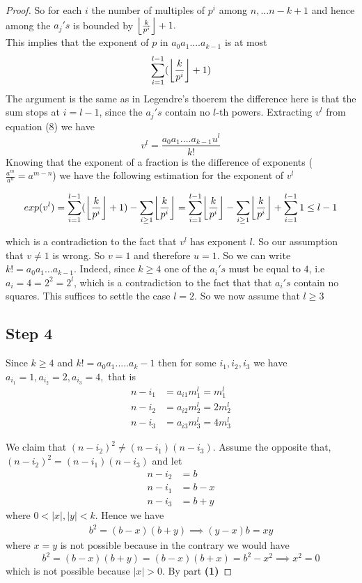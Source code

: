 \documentclass[a4paper]{article}
\DeclarePairedDelimiter\floor{\lfloor}{\rfloor}
\begin{document}
\begin{proof}
So for each $i$ the number of multiples of $p^i$ among $n,...n-k+1$ and hence among the $a_j's$ is bounded by $ \floor*{\frac{k}{p^i}} + 1.$ \\

This implies that the exponent of $p$ in $a_0 a_1....a_{k-1}$ is at most
\begin{equation}
\sum_{i=1}^{l-1} (\floor*{\frac{k}{p^i}} + 1)
\end{equation}
The argument is the same as in Legendre's thoerem the difference here is that the sum stops at $i=l-1$, since the $a_j's$ contain no $l$-th powers. Extracting $v^l$ from equation (8) we have
$$v^l = \frac{a_0 a_1....a_{k-1} u^l}{k!}$$
Knowing that the exponent of a fraction is the difference of exponents ($\frac{a^m}{a^n}=a^{m-n}$) we have the following estimation for the exponent of $v^l$ 

\begin{align}
 exp(v^l)=\sum_{i=1}^{l-1} (\floor*{\frac{k}{p^i}} + 1) - \sum_{i\geq1} \floor*{\frac{k}{p^i}}= \sum_{i=1}^{l-1} \floor*{\frac{k}{p^i}} - \sum_{i\geq1} \floor*{\frac{k}{p^i}} + \sum_{i=1}^{l-1} 1 \leq l-1
\end{align}

which is a contradiction to the fact that $v^l$ has exponent $l$. So our assumption that $v \neq 1$ is wrong. So $v=1$ and therefore $u=1$. So we can write $k!= a_{0}a_{1}\dots a_{k-1}$. Indeed, since $k \geq 4$ one of the $a_i's$ must be equal to $4$, i.e $a_i = 4 = 2^2 =2^l$, which is a contradiction to the fact that that $a_i's$  contain no squares.
This suffices to settle the case $l=2$. So we now assume that $l \geq 3$

\subsection{Step 4}

Since $k \geq 4$ and $k! = a_0 a_1.....a_k-1$ then  for some $i_1, i_2, i_3$ we have $a_{i_1}=1, a_{i_2}=2, a_{i_3}=4,$ that is
\begin{align*}
n-i_1 & = a_{i1} m_1^{l} = m_1^{l}  \\
n-i_2 &= a_{i2} m_2^{l} = 2m_2^{l}\\
n-i_3 &= a_{i3} m_3^{l} = 4m_3^l
\end{align*}

We claim that $(n-i_2)^2 \neq (n-i_1)(n-i_3)$. Assume the opposite that,
$(n-i_2)^2 = (n-i_1)(n-i_3)$ and let 
\begin{align*}
n-i_2&=b \\
n-i_1 &= b-x \\
n-i_3 &= b+y
\end{align*}
where $0 <|x|,|y|<k $. Hence we have
\begin{align*}
b^2 = (b-x)(b+y)  \implies  (y-x)b = xy
\end{align*}
where $x=y$ is not possible because in the contrary we would have 
$$b^2=(b-x)(b+y)=(b-x)(b+x)=b^2-x^2 \implies x^2= 0$$
which is not possible because $|x|>0$. By part \textbf{(1)}


\end{proof}
\end{document}
